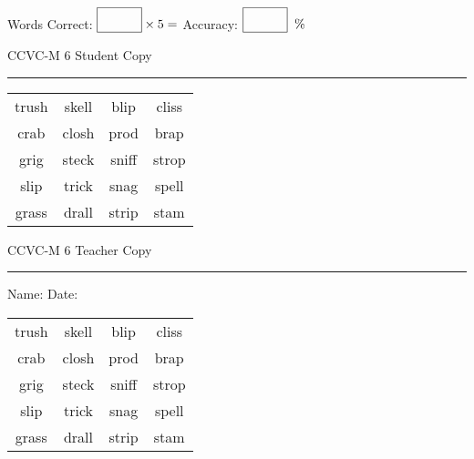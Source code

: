 \documentclass{memoir}
\begin{document}
\small

Words Correct: $\fbox{\phantom{\huge 100}} \times 5 = $ Accuracy: $\fbox{\phantom{\huge 100}}\;\; \%$ 

\vfill

\newpage


\footnotesize \noindent
CCVC-M 6 \hfill Student Copy
\smallskip
\hrule

\Large

\setlength{\tabcolsep}{14pt}
\def\arraystretch{3}

{\selectfont


\begin{vplace}[0.5]
\begin{center}
\begin{tabular}{cccc}
trush & skell & blip & cliss             \\
crab        & closh            & prod & brap               \\
grig      & steck & sniff & strop \\
slip & trick & snag & spell \\
grass                    & drall & strip & stam            \\
\end{tabular}
\end{center}
\end{vplace}

}

\newpage

\footnotesize \noindent
CCVC-M 6 \hfill Teacher Copy
\smallskip
\hrule

\small

\vfill

\noindent
Name: \underline{\hspace{1.75in}} \hfill Date: \underline{\hspace{1in}}

\Large

{\selectfont


\begin{vplace}[0.5]
\begin{center}
\begin{tabular}{cccc}
trush & skell & blip & cliss             \\
crab        & closh            & prod & brap               \\
grig      & steck & sniff & strop \\
slip & trick & snag & spell \\
grass                    & drall & strip & stam            \\
\end{tabular}
\end{center}
\end{vplace}



}
\end{document}
